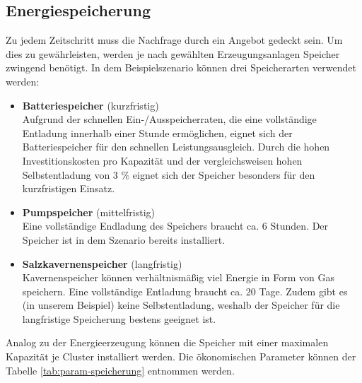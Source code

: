\subsection{Energiespeicherung}
Zu jedem Zeitschritt muss die Nachfrage durch ein Angebot gedeckt sein. Um dies zu gewährleisten, werden je nach gewählten Erzeugungsanlagen Speicher zwingend benötigt.
In dem Beispielszenario können drei Speicherarten verwendet werden:
\begin{itemize}
    \item \textbf{Batteriespeicher} (kurzfristig)\\Aufgrund der schnellen Ein-/Ausspeicherraten, die eine vollständige Entladung innerhalb einer Stunde ermöglichen, eignet sich der Batteriespeicher für den schnellen Leistungsausgleich. Durch die hohen Investitionskosten pro Kapazität und der vergleichsweisen hohen Selbstentladung von 3 \% eignet sich der Speicher besonders für den kurzfristigen Einsatz.
    \item \textbf{Pumpspeicher} (mittelfristig)\\Eine vollständige Endladung des Speichers braucht ca. 6 Stunden. Der Speicher ist in dem Szenario bereits installiert.
    \item \textbf{Salzkavernenspeicher} (langfristig)\\Kavernenspeicher können verhältnismäßig viel Energie in Form von Gas speichern. Eine vollständige Entladung braucht ca. 20 Tage. Zudem gibt es (in unserem Beispiel) keine Selbstentladung, weshalb der Speicher für die langfristige Speicherung bestens geeignet ist.   
\end{itemize}    

Analog zu der Energieerzeugung können die Speicher mit einer maximalen Kapazität je Cluster installiert werden. Die ökonomischen Parameter können der Tabelle \ref{tab:param-speicherung} entnommen werden.

